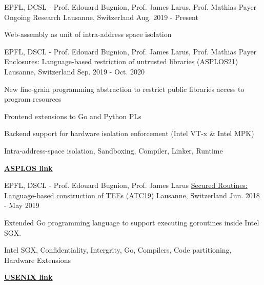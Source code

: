 


\begin{cventries}

\cventry
{EPFL, DCSL - Prof. Edouard Bugnion, Prof. James Larus, Prof. Mathias Payer}
{Ongoing Research}
{Lausanne, Switzerland}
{Aug. 2019 - Present}
{ %
	\begin{cvitems}
  \item{Web-assembly as unit of intra-address space isolation}
	\end{cvitems}
}

\cventry
{EPFL, DSCL - Prof. Edouard Bugnion, Prof. James Larus, Prof. Mathias Payer}
  {Enclosures: Language-based restriction of untrusted libraries (ASPLOS21)}
{Lausanne, Switzerland}
{Sep. 2019  - Oct. 2020}
{
	\begin{cvitems}
  \item{New fine-grain programming abstraction to restrict public libraries access to program resources}
  \item{Frontend extensions to Go and Python PLs}
  \item{Backend support for hardware isolation enforcement (Intel VT-x \& Intel MPK)}
  \item{Intra-address-space isolation, Sandboxing, Compiler, Linker, Runtime}
  \item{\href{https://asplos-conference.org/papers/}{\textbf{ASPLOS link}}}
	\end{cvitems}
}

\cventry
{EPFL, DSCL - Prof. Edouard Bugnion, Prof. James Larus}
  {\href{https://www.usenix.org/system/files/atc19-ghosn_0.pdf}{Secured Routines: Language-based construction of TEEs (ATC19)}}
{Lausanne, Switzerland}
{Jun. 2018  - May 2019}
{
	\begin{cvitems}
  \item{Extended Go programming language to  support executing goroutines inside Intel SGX.}
	\item{Intel SGX, Confidentiality, Intergrity, Go, Compilers, Code partitioning, Hardware Extensions}
  \item{\href{https://www.usenix.org/conference/atc19/presentation/ghosn}{\textbf{USENIX link}}}
	\end{cvitems}
}


\end{cventries}

